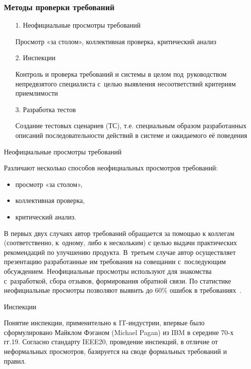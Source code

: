 \documentclass{../industrial-development}
\begin{document}
{\begin{frame} \frametitle {Методы проверки требований}

\begin{itemize}
\item[1.] Неофициальные просмотры требований

{\small Просмотр «за столом», коллективная проверка, критический анализ}

\item[2.] Инспекции

{\small Контроль и проверка требований и системы в целом под~руководством непредвзятого специалиста с~целью выявления несоответствий критериям приемлимости}

\item[3.] Разработка тестов

{\small Создание тестовых сценариев (ТС), т.е. специальным образом разработанных описаний последовательности действий в системе и ожидаемого её поведения}

\end{itemize}
\end{frame}

\lecturenotes

\alert{Неофициальные просмотры требований}

Различают несколько способов неофициальных просмотров требований:
\begin{itemize}
\item просмотр «за столом»,
\item коллективная проверка,
\item критический анализ.
\end{itemize}

В первых двух случаях автор требований обращается за помощью к коллегам (соответственно, к~одному, либо к нескольким) с целью выдачи практических рекомендаций по улучшению продукта. В~третьем случае автор осуществляет презентацию разработанные им требования на совещании с~последующим обсуждением. Неофициальные просмотры используют для знакомства с~разработкой, сбора отзывов, формирования обратной связи. По статистике неофициальные просмотры позволяют выявить до 60\% ошибок в требованиях~\cite[с.~66--67]{Maglinec}.

\alert{Инспекции}

Понятие инспекции, применительно к IT-индустрии, впервые было сформулировано Майклом Фэганом (Michael Pagan) из IBM в середине 70-х гг.19. Согласно стандарту IEEE20, проведение инспекций, в отличие от неформальных просмотров, базируется на своде формальных требований и правил. 

}
\end{document}
